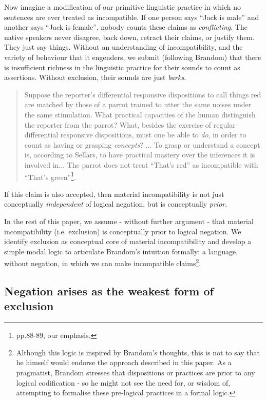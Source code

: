 Now imagine a modification of our primitive linguistic practice in which no
sentences are ever treated as incompatible.  If one person says ``Jack
is male'' and another says ``Jack is female'', nobody counts these
claims as \emph{conflicting}.  The native speakers never disagree,
back down, retract their claims, or justify them. They just say things.
Without an understanding of incompatibility, and the variety of behaviour that it
engenders, we submit (following Brandom) that there is insufficient
richness in the linguistic practice for their sounds to count as
assertions.  Without exclusion, their sounds are just \emph{barks}.
\begin{quote}
Suppose the reporter's differential responsive dispositions to call things red are matched by those of a parrot trained to utter the same noises under the same stimulation. What practical capacities of the human distinguish the reporter from the parrot? What, besides the exercise of regular differential responsive dispositions, must one be able to \emph{do}, in order to count as having or grasping \emph{concepts}? ... To grasp or understand a concept is, according to Sellars, to have practical mastery over the inferences it is involved in... The parrot does not treat ``That's red'' as incompatible with ``That's green''\footnote{\cite{brandom2} pp.88-89, our emphasis.}.
\end{quote}
If this  claim is also accepted, then material incompatibility
is not just conceptually \emph{independent} of logical
negation, but is conceptually \emph{prior}.

In the rest of this paper, we assume - without further argument - that material incompatibility (i.e. exclusion) is conceptually prior to logical negation.
We identify exclusion as conceptual core of material incompatibility and develop a simple
 modal logic to articulate Brandom's intuition formally: a language, without negation, in which we can make incompatible claims\footnote{Although this logic is inspired by Brandom's thoughts, this is not to say that he himself would endorse the approach described in this paper. As a pragmatist, Brandom stresses that dispositions or practices are prior to any logical codification - so he might not see the need for, or wisdom of, attempting to formalise these pre-logical practices in a formal logic.}.

\subsection{Negation arises as the weakest form of exclusion}

